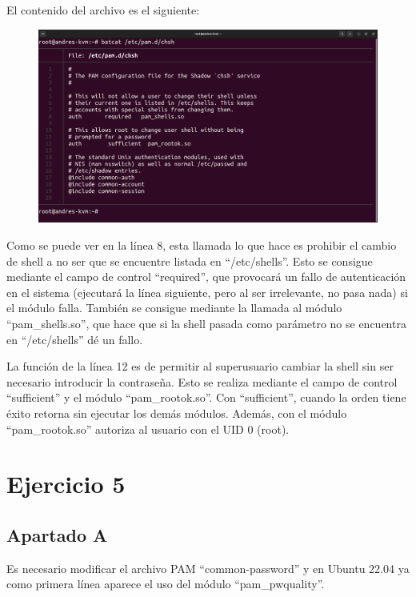 \documentclass{article}
\begin{document}
El contenido del archivo es el siguiente:

\begin{figure}[H]
    \includegraphics[width=\textwidth]{imagenes/pamchsh.png}
\end{figure}


Como se puede ver en la línea 8, esta llamada lo que hace es prohibir el cambio de shell a no ser que se encuentre listada en ``/etc/shells''. Esto se consigue mediante el campo de control ``required'', que provocará un fallo de autenticación en el sistema (ejecutará la línea siguiente, pero al ser irrelevante, no pasa nada) si el módulo falla. También se consigue mediante la llamada al módulo ``pam\_shells.so'', que hace que si la shell pasada como parámetro no se encuentra en ``/etc/shells'' dé un fallo.

La función de la línea 12 es de permitir al superusuario cambiar la shell sin ser necesario introducir la contraseña. Esto se realiza mediante el campo de control ``sufficient'' y el módulo ``pam\_rootok.so''. Con ``sufficient'', cuando la orden tiene éxito retorna sin ejecutar los demás módulos. Además, con el módulo ``pam\_rootok.so'' autoriza al usuario con el UID 0 (root).


\section*{Ejercicio 5}
\subsection*{Apartado A}
Es necesario modificar el archivo PAM ``common-password'' y en Ubuntu 22.04 ya como primera línea aparece el uso del módulo ``pam\_pwquality''. 
\end{document}
